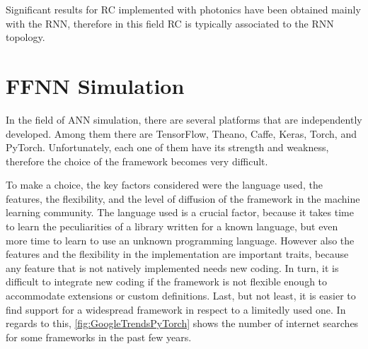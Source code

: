Significant results for \acs{RC} implemented with photonics have been obtained mainly with the \acs{RNN}, therefore in this field \acs{RC} is typically associated to the \acs{RNN} topology.


%


\newpage
\section{FFNN Simulation}
\label{sec:FFNN_Simulation}
In the field of \acs{ANN} simulation, there are several platforms that are independently developed.
Among them there are TensorFlow, Theano, Caffe, Keras, Torch, and PyTorch.
Unfortunately, each one of them have its strength and weakness, therefore the choice of the framework becomes very difficult.

To make a choice, the key factors considered were the language used, the features, the flexibility, and the level of diffusion of the framework in the machine learning community.
The language used is a crucial factor, because it takes time to learn the peculiarities of a library written for a known language, but even more time to learn to use an unknown programming language.
However also the features and the flexibility in the implementation are important traits, because any feature that is not natively implemented needs new coding.
In turn, it is difficult to integrate new coding if the framework is not flexible enough to accommodate extensions or custom definitions.
Last, but not least, it is easier to find support for a widespread framework in respect to a limitedly used one.
In regards to this, \autoref{fig:GoogleTrendsPyTorch} shows the number of internet searches for some frameworks in the past few years.

